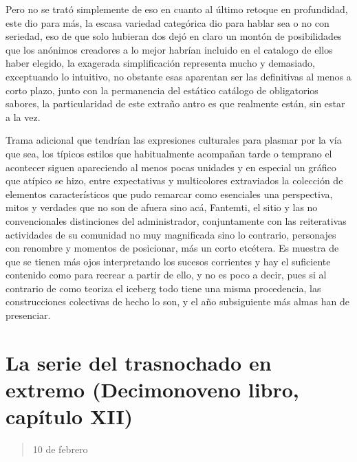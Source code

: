 \documentclass[
]{book}
\begin{document}
Pero no se trató simplemente de eso en cuanto al último retoque en profundidad, este dio para más, la escasa variedad categórica dio para hablar sea o no con seriedad, eso de que solo hubieran dos dejó en claro un montón de posibilidades que los anónimos creadores a lo mejor habrían incluido en el catalogo de ellos haber elegido, la exagerada simplificación representa mucho y demasiado, exceptuando lo intuitivo, no obstante esas aparentan ser las definitivas al menos a corto plazo, junto con la permanencia del estático catálogo de obligatorios sabores, la particularidad de este extraño antro es que realmente están, sin estar a la vez.

Trama adicional que tendrían las expresiones culturales para plasmar por la vía que sea, los típicos estilos que habitualmente acompañan tarde o temprano el acontecer siguen apareciendo al menos pocas unidades y en especial un gráfico que atípico se hizo, entre expectativas y multicolores extraviados la colección de elementos característicos que pudo remarcar como esenciales una perspectiva, mitos y verdades que no son de afuera sino acá, Fantemti, el sitio y las no convencionales distinciones del administrador, conjuntamente con las reiterativas actividades de su comunidad no muy magnificada sino lo contrario, personajes con renombre y momentos de posicionar, más un corto etcétera. Es muestra de que se tienen más ojos interpretando los sucesos corrientes y hay el suficiente contenido como para recrear a partir de ello, y no es poco a decir, pues si al contrario de como teoriza el iceberg todo tiene una misma procedencia, las construcciones colectivas de hecho lo son, y el año subsiguiente más almas han de presenciar.

\hypertarget{la-serie-del-trasnochado-en-extremo-decimonoveno-libro-capuxedtulo-xii}{%
\section{La serie del trasnochado en extremo (Decimonoveno libro, capítulo XII)}\label{la-serie-del-trasnochado-en-extremo-decimonoveno-libro-capuxedtulo-xii}}

\begin{quote}
10 de febrero
\end{quote}
\end{document}
